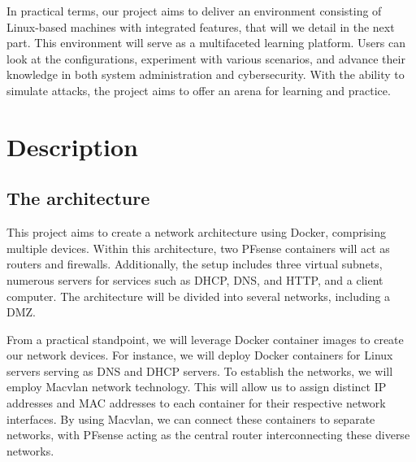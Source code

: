 \documentclass[a4paper,10pt]{article}
\begin{document}
In practical terms, our project aims to deliver an environment consisting of Linux-based machines with integrated features, that will we detail in the next part. This environment will serve as a multifaceted learning platform. Users can look at the configurations, experiment with various scenarios, and advance their knowledge in both system administration and cybersecurity. With the ability to simulate attacks, the project aims to offer an arena for learning and practice.

\newpage

\section{Description}
\subsection{The architecture}
This project aims to create a network architecture using Docker, comprising multiple devices. Within this architecture, two PFsense containers will act as routers and firewalls. Additionally, the setup includes three virtual subnets, numerous servers for services such as DHCP, DNS, and HTTP, and a client computer. The architecture will be divided into several networks, including a DMZ.
\par
From a practical standpoint, we will leverage Docker container images to create our network devices. For instance, we will deploy Docker containers for Linux servers serving as DNS and DHCP servers. To establish the networks, we will employ Macvlan network technology. This will allow us to assign distinct IP addresses and MAC addresses to each container for their respective network interfaces. By using Macvlan, we can connect these containers to separate networks, with PFsense acting as the central router interconnecting these diverse networks.\par
\end{document}

